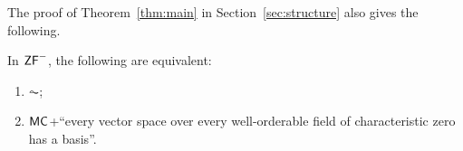 The proof of Theorem~\ref{thm:main} in Section~\ref{sec:structure} also gives the following.

\begin{corollary}\label{cor:restricted}
In $\mathsf{ZF}^{-}$, the following are equivalent:
\begin{enumerate}
\item $\AC$;
\item $\mathsf{MC}$+``every vector space over every well-orderable field of characteristic zero has a basis''.
\end{enumerate}
\end{corollary}
